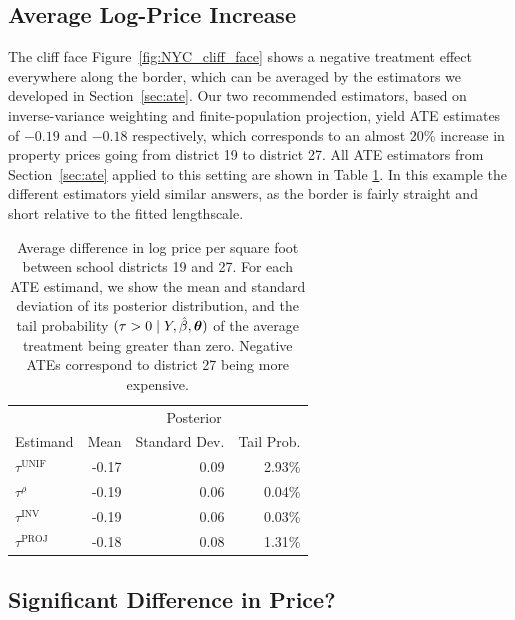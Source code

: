 \documentclass[letter,12pt]{article}
\let\Pr\relax
\DeclareMathOperator{\Pr}{\mathbb{P}}
\newcommand{\unifavg}{\tau^{\mathrm{UNIF}}}
\newcommand{\invvar}{\tau^{\mathrm{INV}}}
\newcommand{\taurho}{\tau^{\rho}}
\newcommand{\tauproj}{\tau^{\mathrm{PROJ}}}
\newcommand{\taugeo}{\tau^{\mathrm{GEO}}}
\newcommand{\taupop}{\tau^{\mathrm{POP}}}
\newcommand{\hyperparam}{\bm{\theta}}
\begin{document}
\hypertarget{average-log-price-increase}{%
\subsection{Average Log-Price Increase}\label{average-log-price-increase}}

The cliff face Figure~\ref{fig:NYC_cliff_face} shows a negative treatment effect everywhere along the border, which can be averaged by the estimators we developed in Section~\ref{sec:ate}.
Our two recommended estimators, based on inverse-variance weighting and finite-population projection, yield ATE estimates of \(-0.19\) and \(-0.18\) respectively, which corresponds to an almost 20\% increase in property prices going from district 19 to district 27.
All ATE estimators from Section~\ref{sec:ate} applied to this setting are shown in Table \ref{table:NYC_ate}.
In this example the different estimators yield similar answers, as the border is fairly straight and short relative to the fitted lengthscale.


\begin{table}
    \centering
    \begin{tabular}{lrrr}
        \hline
        & \multicolumn{3}{c}{Posterior} \\
        Estimand & Mean & Standard Dev. & Tail Prob. \\
        \hline
        $\unifavg$ & -0.17 & 0.09 & 2.93\% \\
        $\taurho$  & -0.19 & 0.06 & 0.04\% \\
        $\invvar$  & -0.19 & 0.06 & 0.03\% \\
        $\tauproj$ & -0.18 & 0.08 & 1.31\% \\
        \hline
    \end{tabular}
    \caption{
    \label{table:NYC_ate}
    Average difference in log price per square foot between school districts 19 and 27. For each ATE estimand, we show the mean and standard deviation of its posterior distribution, and the tail probability $\Pr(\tau > 0 \mid Y, \hat{\beta}, \hyperparam)$ of the average treatment being greater than zero. Negative ATEs correspond to district 27 being more expensive.}
\end{table}
\hypertarget{significant-difference-in-price}{%
\subsection{Significant Difference in Price?}\label{significant-difference-in-price}}
\end{document}

